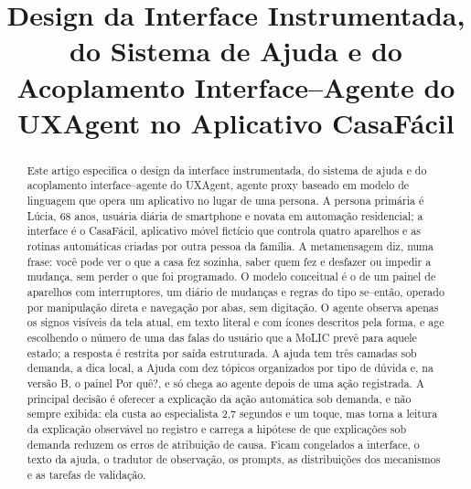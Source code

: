 \documentclass[conference]{IEEEtran}
\begin{document}
\title{Design da Interface Instrumentada, do Sistema de Ajuda e do Acoplamento Interface--Agente do UXAgent no Aplicativo CasaFácil}

\author{
\and
{}
}

\maketitle

\begin{abstract}
Este artigo especifica o design da interface instrumentada, do sistema de ajuda e do acoplamento interface--agente do UXAgent, agente proxy baseado em modelo de linguagem que opera um aplicativo no lugar de uma persona. A persona primária é Lúcia, 68 anos, usuária diária de smartphone e novata em automação residencial; a interface é o CasaFácil, aplicativo móvel fictício que controla quatro aparelhos e as rotinas automáticas criadas por outra pessoa da família. A metamensagem diz, numa frase: você pode ver o que a casa fez sozinha, saber quem fez e desfazer ou impedir a mudança, sem perder o que foi programado. O modelo conceitual é o de um painel de aparelhos com interruptores, um diário de mudanças e regras do tipo se--então, operado por manipulação direta e navegação por abas, sem digitação. O agente observa apenas os signos visíveis da tela atual, em texto literal e com ícones descritos pela forma, e age escolhendo o número de uma das falas do usuário que a MoLIC prevê para aquele estado; a resposta é restrita por saída estruturada. A ajuda tem três camadas sob demanda, a dica local, a Ajuda com dez tópicos organizados por tipo de dúvida e, na versão B, o painel Por quê?, e só chega ao agente depois de uma ação registrada. A principal decisão é oferecer a explicação da ação automática sob demanda, e não sempre exibida: ela custa ao especialista 2,7 segundos e um toque, mas torna a leitura da explicação observável no registro e carrega a hipótese de que explicações sob demanda reduzem os erros de atribuição de causa. Ficam congelados a interface, o texto da ajuda, o tradutor de observação, os prompts, as distribuições dos mecanismos e as tarefas de validação.
\end{abstract}
\end{document}
